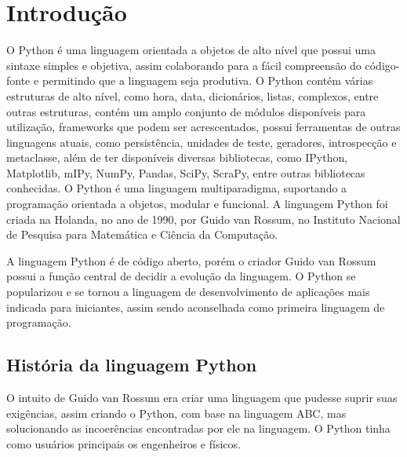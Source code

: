 


\chapter{ Introdução}
O Python é uma linguagem orientada a objetos de alto nível que possui uma sintaxe simples e objetiva, assim colaborando para a fácil compreensão do código-fonte e permitindo que a linguagem seja produtiva. O Python contém várias estruturas de alto nível, como hora, data, dicionários, listas, complexos, entre outras estruturas, contém um amplo conjunto de módulos disponíveis para utilização, frameworks que podem ser acrescentados, possui ferramentas de outras linguagens atuais, como persistência, unidades de teste, geradores, introspecção e metaclasse, além de ter disponíveis diversas bibliotecas, como IPython, Matplotlib, mIPy, NumPy, Pandas, SciPy, ScraPy, entre outras bibliotecas conhecidas. O Python é uma linguagem multiparadigma, suportando a programação orientada a objetos, modular e funcional. A linguagem Python foi criada na Holanda, no ano de 1990, por Guido van Rossum, no Instituto Nacional de Pesquisa para Matemática e Ciência da Computação. \cite{Borges2014}


A linguagem Python é de código aberto, porém o criador Guido van Rossum possui a função central de decidir a evolução da linguagem. O Python se popularizou e se tornou a linguagem de desenvolvimento de aplicações mais indicada para iniciantes, assim sendo aconselhada como primeira linguagem de programação.\cite{Perkovic2016}


\section{História da linguagem Python}
O intuito de Guido van Rossum era criar uma linguagem que pudesse suprir suas exigências, assim criando o Python, com base na linguagem ABC, mas solucionando as incoerências encontradas por ele na linguagem. O Python tinha como usuários principais os engenheiros e físicos.


